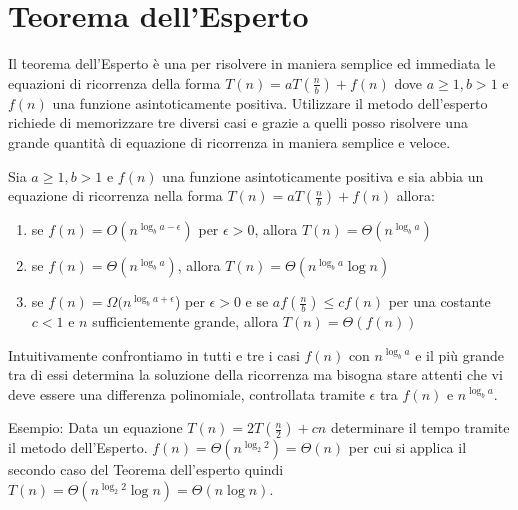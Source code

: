 \section{Teorema dell'Esperto}
Il teorema dell'Esperto è una per risolvere in maniera semplice ed immediata
le equazioni di ricorrenza della forma $T(n) = aT(\frac{n}{b}) + f(n)$
dove $a \geq 1 , b > 1$ e $f(n)$ una funzione asintoticamente positiva.
Utilizzare il metodo dell'esperto richiede di memorizzare tre diversi casi e grazie
a quelli posso risolvere una grande quantità di equazione di ricorrenza in maniera semplice e veloce.

\begin{thm}
Sia $a \geq 1, b > 1$ e $f(n)$ una funzione asintoticamente positiva e sia abbia
un equazione di ricorrenza nella forma $T(n) = aT(\frac{n}{b}) + f(n)$ allora:
\begin{enumerate}
  \item se $f(n) = O(n^{\log _b  a - \epsilon})$ per $\epsilon > 0$, allora $T(n) = \Theta(n^{\log _b  a})$
  \item se $f(n) = \Theta(n^{\log _b a})$, allora $T(n) = \Theta(n^{\log _b  a} \log n)$
  \item se $f(n) = \Omega(n^{\log _b  a + \epsilon}$) per $\epsilon > 0$ e se
        $af(\frac{n}{b}) \leq cf(n)$ per una costante $c < 1$ e $n$ sufficientemente grande,
        allora $T(n) = \Theta(f(n))$
\end{enumerate}
\end{thm}
Intuitivamente confrontiamo in tutti e tre i casi $f(n)$ con $n ^{\log _ b  a}$
e il più grande tra di essi determina la soluzione della ricorrenza ma bisogna stare attenti
che vi deve essere una differenza polinomiale, controllata tramite $\epsilon$ tra $f(n)$ e $n^{\log _b  a}$.

Esempio:\newline
Data un equazione $T(n) = 2T(\frac{n}{2}) + cn$ determinare il tempo tramite il metodo dell'Esperto.
$f(n) = \Theta(n^{\log _ 2 2}) = \Theta(n)$ per cui si applica il secondo caso del Teorema dell'esperto
quindi $T(n) = \Theta(n^{\log _2 2} \log n) = \Theta(n \log n)$.
